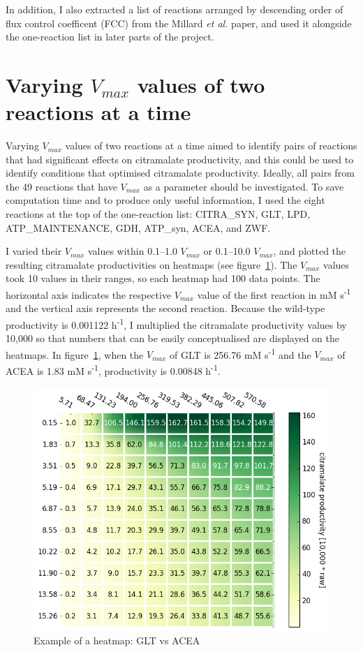\documentclass[parskip=full, numbers=noenddot]{scrreprt}
\begin{document}
In addition, I also extracted a list of reactions arranged by descending order of flux control coefficent (FCC) from the Millard \emph{et al.} paper, and used it alongside the one-reaction list in later parts of the project.

\section{Varying $V_{max}$ values of two reactions at a time}
\label{sec:couples}

Varying $V_{max}$ values of two reactions at a time aimed to identify pairs of reactions that had significant effects on citramalate productivity, and this could be used to identify conditions that optimised citramalate productivity. Ideally, all pairs from the 49 reactions that have $V_{max}$ as a parameter should be investigated. To save computation time and to produce only useful information, I used the eight reactions at the top of the one-reaction list: CITRA\_SYN, GLT, LPD, ATP\_MAINTENANCE, GDH, ATP\_syn, ACEA, and ZWF.

I varied their $V_{max}$ values within 0.1--1.0 $V_{max}$ or 0.1--10.0 $V_{max}$, and plotted the resulting citramalate productivities on heatmaps (see figure~\ref{fig:heatmapsample}). The $V_{max}$ values took 10 values in their ranges, so each heatmap had 100 data points. The horizontal axis indicates the respective $V_{max}$ value of the first reaction in mM s\textsuperscript{-1} and the vertical axis represents the second reaction. Because the wild-type productivity is 0.001122 h\textsuperscript{-1}, I multiplied the citramalate productivity values by 10,000 so that numbers that can be easily conceptualised are displayed on the heatmaps. In figure~\ref{fig:heatmapsample}, when the $V_{max}$ of GLT is 256.76 mM s\textsuperscript{-1} and the $V_{max}$ of ACEA is 1.83 mM s\textsuperscript{-1}, productivity is 0.00848 h\textsuperscript{-1}.

\begin{figure}[htbp]
  \centering
  \includegraphics[scale=0.5]{heatmapsample}
  \caption{Example of a heatmap: GLT vs ACEA}
  \label{fig:heatmapsample}
\end{figure}
\end{document}
